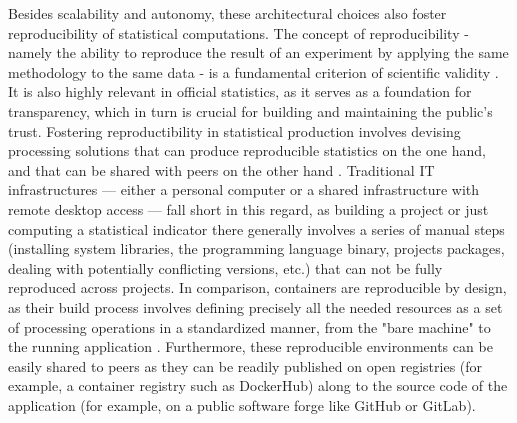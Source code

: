 Besides scalability and autonomy, these architectural choices also foster reproducibility of statistical computations. The concept of reproducibility - namely the ability to reproduce the result of an experiment by applying the same methodology to the same data - is a fundamental criterion of scientific validity \cite{mcnutt2014reproducibility}. It is also highly relevant in official statistics, as it serves as a foundation for transparency, which in turn is crucial for building and maintaining the public's trust. Fostering reproductibility in statistical production involves devising processing solutions that can produce reproducible statistics on the one hand, and that can be shared with peers on the other hand \cite{ntts2019reproducibility}. Traditional IT infrastructures — either a personal computer or a shared infrastructure with remote desktop access — fall short in this regard, as building a project or just computing a statistical indicator there generally involves a series of manual steps (installing system libraries, the programming language binary, projects packages, dealing with potentially conflicting versions, etc.) that can not be fully reproduced across projects. In comparison, containers are reproducible by design, as their build process involves defining precisely all the needed resources as a set of processing operations in a standardized manner, from the "bare machine" to the running application \cite{moreau2023containers}. Furthermore, these reproducible environments can be easily shared to peers as they can be readily published on open registries (for example, a container registry such as DockerHub) along to the source code of the application (for example, on a public software forge like GitHub or GitLab).

